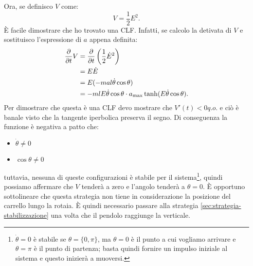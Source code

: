 Ora, se definisco $V$ come:
\begin{equation}
    V = \frac 1 2 E^2.
    \label{eq:lyapunov-energy}
\end{equation}
È facile dimostrare che ho trovato una CLF. Infatti, se calcolo la detivata di $V$ e sostituisco l'espressione di $a$ appena definita:
\begin{equation}
    \begin{aligned}
        \frac \partial {\partial t} V &= \frac \partial {\partial t} \left( \frac 1 2 \dot E^2\right) \\
        &=  E \dot E \\
        &=  E (-mal \dot \theta \cos \theta) \\
        &= -mlE\dot \theta \cos \theta \cdot a_{\max} \tanh(E \dot \theta \cos \theta).
    \end{aligned}
    \label{eq:lyapunov-energy}
\end{equation}
Per dimostrare che questa è una CLF devo mostrare che $V'(t) < 0 q.o.$ e ciò è banale visto che la tangente iperbolica preserva il segno. Di conseguenza la funzione è negativa a patto che:
\begin{itemize}
    \item $\dot \theta \neq 0$
    \item $\cos \theta \neq 0$
\end{itemize}
tuttavia, nessuna di queste configurazioni è stabile per il sistema\footnote{$\dot \theta = 0$ è stabile se $\theta = \{0, \pi\}$, ma $\theta = 0$ è il punto a cui vogliamo arrivare e $\theta = \pi$ è il punto di partenza; basta quindi fornire un impulso iniziale al sistema e questo inizierà a muoversi.}, quindi possiamo affermare che $V$ tenderà a zero e l'angolo tenderà a $\theta = 0$.
È opportuno sottolineare che questa strategia non tiene in considerazione la posizione del carrello lungo la rotaia. È quindi necessario passare alla strategia \ref{sec:strategia-stabilizzazione}
una volta che il pendolo raggiunge la verticale.